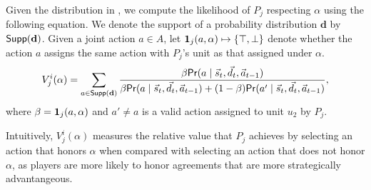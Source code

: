 
Given the distribution in , we compute the likelihood of $P_j$ respecting $\alpha$ using the following equation. 
We denote the support of a probability distribution $\mathbf{d}$ by $\mathsf{Supp}(\mathbf{d})$. 
Given a joint action $a \in A$, let  $\mathbf{1}_j(a, \alpha) \mapsto \{\top, \bot\}$ denote whether the action $a$ assigns the same action with $P_j$'s unit as that assigned under $\alpha$. 
\begin{align*}
	V_j^i(\alpha) = \sum\limits_{a \in \mathsf{Supp}(\mathbf{d})} \frac{\beta \mathsf{Pr}(a \mid \vec{s}_t, \vec{d}_t, \vec{a}_{t-1})}{\beta \mathsf{Pr}(a \mid \vec{s}_t, \vec{d}_t, \vec{a}_{t-1}) + (1 - \beta) \mathsf{Pr}(a' \mid \vec{s}_t, \vec{d}_t, \vec{a}_{t-1})},
\end{align*}
where $\beta = \mathbf{1}_j(a, \alpha)$ and $a' \neq a$ is a valid action assigned to unit $u_2$ by $P_j$.

Intuitively, $V_j^i(\alpha)$ measures the relative value that $P_j$ achieves by selecting an action that honors $\alpha$ when compared with  selecting an action that does not honor $\alpha$, as players are more likely to honor agreements that are more strategically advantangeous. 


